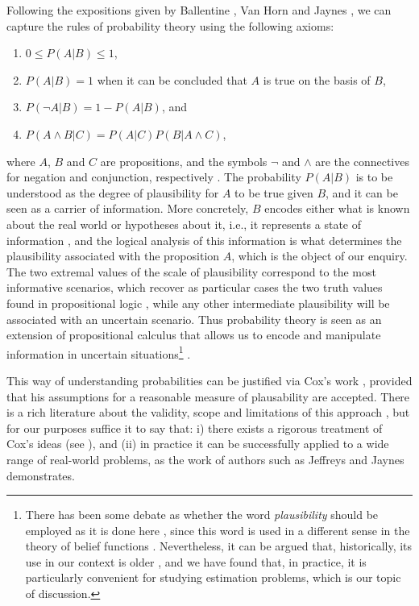 Following the expositions given by Ballentine \cite{ballentine1998}, Van Horn \cite{vanhorn2003} and Jaynes \cite{jaynes2003}, we can capture the rules of probability theory using the following axioms:
\begin{enumerate}
\item $0 \leqslant P(A|B) \leqslant 1$,
\item $P(A|B) = 1$ when it can be concluded that $A$ is true on the basis of $B$,
\item $P(\neg A | B) = 1 - P(A | B)$, and
\item $P(A \land B | C) = P(A | C) P(B |A \land C)$,
\end{enumerate}
where $A$, $B$ and $C$ are propositions, and the symbols $\neg$ and $\land$ are the connectives for negation and conjunction, respectively \cite{nidditch1962, copi2016}. The probability $P(A|B)$ is to be understood as the degree of plausibility for $A$ to be true given $B$, and it can be seen as a carrier of information. More concretely, $B$ encodes either what is known about the real world or hypotheses about it, i.e., it represents a state of information \cite{jaynes2003, vanhorn2003}, and the logical analysis of this information is what determines the plausibility associated with the proposition $A$, which is the object of our enquiry. The two extremal values of the scale of plausibility correspond to the most informative scenarios, which recover as particular cases the two truth values found in propositional logic \cite{jaynes2003, nidditch1962, copi2016}, while any other intermediate plausibility will be associated with an uncertain scenario. Thus probability theory is seen as an extension of propositional calculus that allows us to encode and manipulate information in uncertain situations\footnote{There has been some debate as whether the word \emph{plausibility} should be employed as it is done here \cite{shafer2004, vanhorn2004}, since this word is used in a different sense in the theory of belief functions \cite{shafer2004}. Nevertheless, it can be argued that, historically, its use in our context is older \cite{vanhorn2004}, and we have found that, in practice, it is particularly convenient for studying estimation problems, which is our topic of discussion.} \cite{jaynes2003}. 

This way of understanding probabilities can be justified via Cox's work \cite{cox1946, cox1961}, provided that his assumptions for a reasonable measure of plausability are accepted. There is a rich literature about the validity, scope and limitations of this approach \cite{paris1994, vanhorn2003, colyvan2004, clayton2017, vanhorn2017}, but for our purposes suffice it to say that: i) there exists a rigorous treatment of Cox's ideas (see \cite{paris1994}), and (ii) in practice it can be successfully applied to a wide range of real-world problems, as the work of authors such as Jeffreys \cite{jeffreys1961} and Jaynes \cite{jaynes2003} demonstrates.


